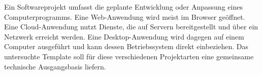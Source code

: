 \begin{beginnerstatement}

Ein Softwareprojekt umfasst die geplante Entwicklung oder Anpassung eines
Computerprogramms. Eine Web-Anwendung wird meist im Browser geöffnet. Eine
Cloud-Anwendung nutzt Dienste, die auf Servern bereitgestellt und über ein
Netzwerk erreicht werden. Eine Desktop-Anwendung wird dagegen auf einem
Computer ausgeführt und kann dessen Betriebssystem direkt einbeziehen. Das
untersuchte Template soll für diese verschiedenen Projektarten eine gemeinsame
technische Ausgangsbasis liefern.

\end{beginnerstatement}
